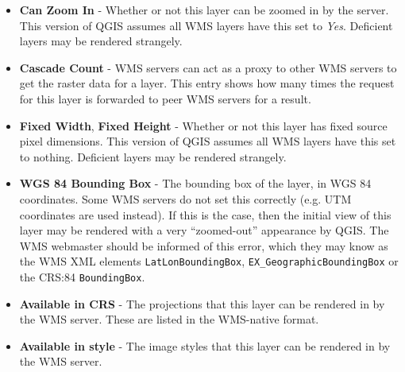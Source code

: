 \begin{itemize}
\begin{itemize}
\item \textbf{Can Zoom In}      - Whether or not this layer can be zoomed in by the server.  This version
                                  of QGIS assumes all WMS layers have this set to \textsl{Yes}.
                                  Deficient layers may be rendered strangely.

\item \textbf{Cascade Count}    - WMS servers can act as a proxy to other WMS servers to get
                                  the raster data for a layer.  This entry shows how
                                  many times the request for this layer is forwarded to peer
                                  WMS servers for a result.

\item \textbf{Fixed Width}, \textbf{Fixed Height}
                                - Whether or not this layer has fixed source pixel dimensions.
                                  This version
                                  of QGIS assumes all WMS layers have this set to nothing.
                                  Deficient layers may be rendered strangely.

\item \textbf{WGS 84 Bounding Box} - The bounding box of the layer, in WGS 84 coordinates.
                                     Some WMS servers do not set this correctly (e.g. UTM
                                     coordinates are used instead).  If this is the case,
                                     then the initial view of this layer may be rendered
                                     with a very ``zoomed-out'' appearance by QGIS.
                                     The WMS webmaster should be informed of this error,
                                     which they may know as the WMS XML elements
                                     \texttt{LatLonBoundingBox},
                                     \texttt{EX\_GeographicBoundingBox} or
                                     the CRS:84 \texttt{BoundingBox}.

\item \textbf{Available in CRS} - The projections that this layer can be rendered in by
                                  the WMS server.  These are listed in the WMS-native format.

\item \textbf{Available in style} - The image styles that this layer can be rendered in by
                                    the WMS server.

\end{itemize}

\end{itemize}


